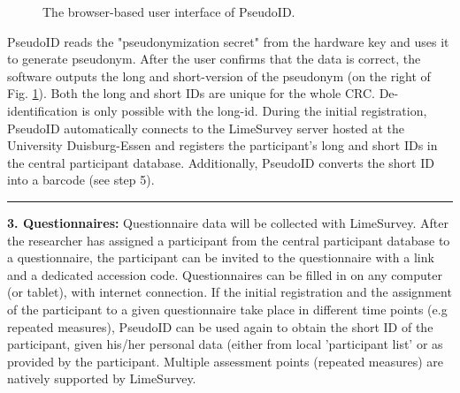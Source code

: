 \begin{figure}
{}
\hfill
{}
\caption{The browser-based user interface of PseudoID.}
\label{fig:screenshots}
\end{figure}

PseudoID reads the "pseudonymization secret" from the hardware key and uses it to generate pseudonym. After the user confirms that the data is correct, the software outputs the long and short-version of the pseudonym (on the right of Fig. \ref{fig:screenshots}). Both the long and short IDs are unique for the whole CRC. De-identification is only possible with the long-id. During the initial registration, PseudoID automatically connects to the LimeSurvey server hosted at the University Duisburg-Essen and registers the participant's long and short IDs in the central participant database. Additionally, PseudoID converts the short ID into a barcode (see step 5).

\par\noindent\rule{\textwidth\color{pniblue}}{0.4pt}
\textbf{3. Questionnaires:}
 Questionnaire data will be collected with LimeSurvey. After the researcher has assigned a participant from the central participant database to a questionnaire, the participant can be invited to the questionnaire with a link and a dedicated accession code. Questionnaires can be filled in on any computer (or tablet), with internet connection. 
 If the initial registration and the assignment of the participant to a given questionnaire take place in different time points (e.g repeated measures), PseudoID can be used again to obtain the short ID of the participant, given his/her personal data (either from local 'participant list' or as provided by the participant.
 Multiple assessment points (repeated measures) are natively supported by LimeSurvey.
 
